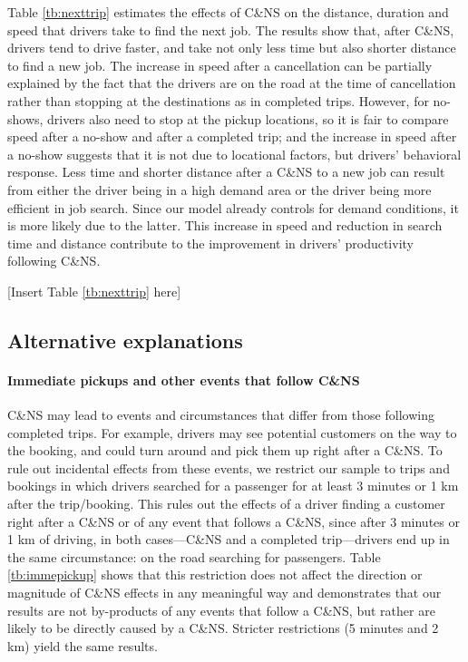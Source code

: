 \documentclass[reviewmode]{restat}
\begin{document}
Table \ref{tb:nexttrip} estimates the effects of C\&NS on the distance, duration and speed that drivers 
take to find the next job. The results show that, after C\&NS, drivers tend to drive faster, and take not
only less time but also shorter distance to find a new job. The increase in speed after a cancellation can
be partially explained by the fact that the drivers are on the road at the time of cancellation rather than 
stopping at the destinations as in completed trips. However, for no-shows, drivers also need to stop at the
pickup locations, so it is fair to compare speed after a no-show and after a completed trip; and the increase
in speed after a no-show suggests that it is not due to locational factors, but drivers' behavioral response.
Less time and shorter distance after a C\&NS to a new job can result from either the driver being in a high
demand area or the driver being more efficient in job search. Since our model already controls for demand 
conditions, it is more likely due to the latter. This increase in speed and reduction in search time and 
distance contribute to the improvement in drivers' productivity following C\&NS.

\begin{center}
	[Insert Table \ref{tb:nexttrip} here]
\end{center}

\subsection{Alternative explanations}

\paragraph{Immediate pickups and other events that follow C\&NS} C\&NS may lead to events and circumstances 
that differ from those following completed trips. For example, drivers may see potential customers on the way
to the booking, and could turn around and pick them up right after a C\&NS. 
To rule out incidental effects from these events, we restrict our sample to trips and bookings in which 
drivers searched for a passenger for at least 3 minutes or 1 km after the trip/booking. This rules out the
effects of a driver finding a customer right after a C\&NS or of any event that follows a C\&NS, since after
3 minutes or 1 km of driving, in both cases---C\&NS and a completed trip---drivers end up in the same 
circumstance: on the road searching for passengers. Table \ref{tb:immepickup} shows that this restriction 
does not affect the direction or magnitude of C\&NS effects in any meaningful way and demonstrates that our
results are not by-products of any events that follow a C\&NS, but rather are likely to be directly caused 
by a C\&NS. Stricter restrictions (5 minutes and 2 km) yield the same results.
\end{document}

